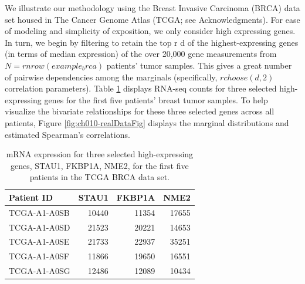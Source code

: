 \documentclass{article}
\begin{document}
We illustrate our methodology using the Breast Invasive Carcinoma (BRCA)
data set housed in The Cancer Genome Atlas (TCGA; see Acknowledgments).
For ease of modeling and simplicity of exposition, we only consider high
expressing genes. In turn, we begin by filtering to retain the top r d
of the highest-expressing genes (in terms of median expression) of the
over 20,000 gene measurements from \(N=r nrow(example_brca)\) patients'
tumor samples. This gives a great number of pairwise dependencies among
the marginals (specifically, \(r choose(d,2)\) correlation parameters).
Table \ref{tab:ch010-realDataTab} displays RNA-seq counts for three
selected high-expressing genes for the first five patients' breast tumor
samples. To help visualize the bivariate relationships for these three
selected genes across all patients, Figure \ref{fig:ch010-realDataFig}
displays the marginal distributions and estimated Spearman's
correlations.

\begin{table}

\caption{\label{tab:ch010-realDataTab}mRNA expression for three selected high-expressing genes, STAU1, FKBP1A, NME2, for the first five patients in the TCGA BRCA data set.}
\centering
\begin{tabular}[t]{lrrr}
\toprule
Patient ID & STAU1 & FKBP1A & NME2\\
\midrule
TCGA-A1-A0SB & 10440 & 11354 & 17655\\
TCGA-A1-A0SD & 21523 & 20221 & 14653\\
TCGA-A1-A0SE & 21733 & 22937 & 35251\\
TCGA-A1-A0SF & 11866 & 19650 & 16551\\
TCGA-A1-A0SG & 12486 & 12089 & 10434\\
\bottomrule
\end{tabular}
\end{table}
\end{document}
